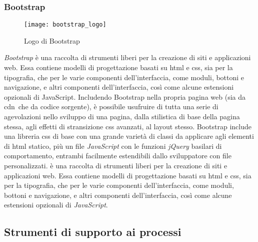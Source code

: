 \subsubsection{Bootstrap}
\begin{figure}[htb] 
    \centering 
    \texttt{[image: bootstrap\_logo]} 
    \caption{Logo di Bootstrap}
\end{figure}
\emph{Bootstrap} è una raccolta di strumenti liberi per la creazione di siti e applicazioni web. Essa contiene modelli di progettazione basati su \gls{html} e \gls{css}, sia per la tipografia, che per le varie componenti dell'interfaccia, come moduli, bottoni e navigazione, e altri componenti dell'interfaccia, così come alcune estensioni opzionali di JavaScript.
Includendo Bootstrap nella propria pagina web (sia da \gls{cdn}\glsfirstoccur\  che da codice sorgente), è possibile usufruire di tutta una serie di agevolazioni nello sviluppo di una pagina, dalla stilistica di base della pagina stessa, agli effetti di stransizione \gls{css} avanzati, al layout stesso. 
Bootstrap include una libreria \gls{css} di base con una grande varietà di classi da applicare agli elementi di \gls{html} statico, più un file \emph{JavaScript} con le funzioni \emph{jQuery} basilari di comportamento, entrambi facilmente estendibili dallo sviluppatore con file personalizzati. è una raccolta di strumenti liberi per la creazione di siti e applicazioni web. Essa contiene modelli di progettazione basati su \gls{html} e \gls{css}, sia per la tipografia, che per le varie componenti dell'interfaccia, come moduli, bottoni e navigazione, e altri componenti dell'interfaccia, così come alcune estensioni opzionali di \emph{JavaScript}.

\subsection{Strumenti di supporto ai processi}
